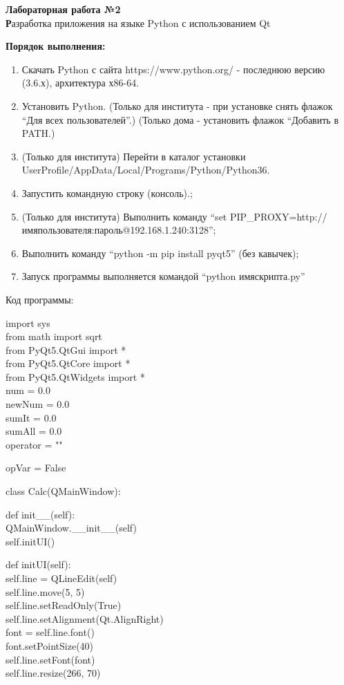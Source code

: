 \begin{center}
\textbf{Лабораторная работа №2}
\\
\textbf Разработка приложения на языке Python с использованием Qt
\\
\end{center}
\textbf{Порядок выполнения:} 
\begin{enumerate}
\item Скачать Python с сайта https://www.python.org/ - последнюю версию (3.6.х), архитектура х86-64.
\item Установить Python. (Только для института - при установке снять флажок “Для всех пользователей”.) (Только дома - установить флажок “Добавить в PATH.)
\item (Только для института) Перейти в каталог установки UserProfile/AppData/Local/Programs/Python/Python36.
\item Запустить командную строку (консоль).;
\item (Только для института) Выполнить команду “set PIP\_PROXY=http://имяпользователя:пароль@192.168.1.240:3128”;
\item Выполнить команду “python -m pip install pyqt5” (без кавычек);
\item Запуск программы выполняется командой “python имяскрипта.py”
\\
\end{enumerate}
\newpage
Код программы:

import sys\\
from math import sqrt\\
from PyQt5.QtGui import *\\
from PyQt5.QtCore import *\\
from PyQt5.QtWidgets import *
\\
num = 0.0\\
newNum = 0.0\\
sumIt = 0.0\\
sumAll = 0.0\\
operator = ""

opVar = False

class Calc(QMainWindow):

    def init\_\_(self):\\
        QMainWindow.\_\_init\_\_(self)\\
        self.initUI()

    def initUI(self):\\
        self.line = QLineEdit(self)\\
        self.line.move(5, 5)\\
        self.line.setReadOnly(True)\\
        self.line.setAlignment(Qt.AlignRight)\\
        font = self.line.font()\\
        font.setPointSize(40)\\
        self.line.setFont(font)\\
        self.line.resize(266, 70)\\

